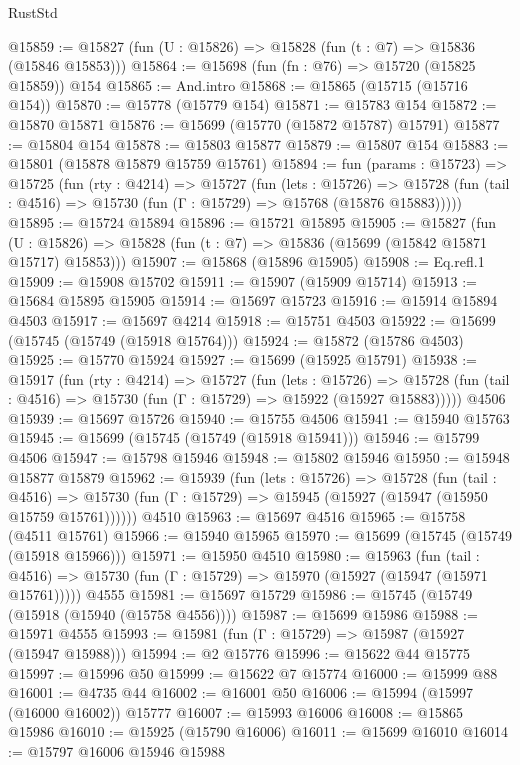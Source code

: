 \begin{lexlean}{RustStd}
\begin{coremodule}
@15859 := @15827 (fun (U : @15826) => @15828 (fun (t : @7) => @15836 (@15846 @15853)))
@15864 := @15698 (fun (fn : @76) => @15720 (@15825 @15859)) @154
@15865 := And.intro
@15868 := @15865 (@15715 (@15716 @154))
@15870 := @15778 (@15779 @154)
@15871 := @15783 @154
@15872 := @15870 @15871
@15876 := @15699 (@15770 (@15872 @15787) @15791)
@15877 := @15804 @154
@15878 := @15803 @15877
@15879 := @15807 @154
@15883 := @15801 (@15878 @15879 @15759 @15761)
@15894 := fun (params : @15723) =>
  @15725
    (fun (rty : @4214) =>
    @15727
      (fun (lets : @15726) =>
      @15728 (fun (tail : @4516) => @15730 (fun (Γ : @15729) => @15768 (@15876 @15883)))))
@15895 := @15724 @15894
@15896 := @15721 @15895
@15905 := @15827
    (fun (U : @15826) => @15828 (fun (t : @7) => @15836 (@15699 (@15842 @15871 @15717) @15853)))
@15907 := @15868 (@15896 @15905)
@15908 := Eq.refl.{1}
@15909 := @15908 @15702
@15911 := @15907 (@15909 @15714)
@15913 := @15684 @15895 @15905
@15914 := @15697 @15723
@15916 := @15914 @15894 @4503
@15917 := @15697 @4214
@15918 := @15751 @4503
@15922 := @15699 (@15745 (@15749 (@15918 @15764)))
@15924 := @15872 (@15786 @4503)
@15925 := @15770 @15924
@15927 := @15699 (@15925 @15791)
@15938 := @15917
    (fun (rty : @4214) =>
    @15727
      (fun (lets : @15726) =>
      @15728 (fun (tail : @4516) => @15730 (fun (Γ : @15729) => @15922 (@15927 @15883)))))
    @4506
@15939 := @15697 @15726
@15940 := @15755 @4506
@15941 := @15940 @15763
@15945 := @15699 (@15745 (@15749 (@15918 @15941)))
@15946 := @15799 @4506
@15947 := @15798 @15946
@15948 := @15802 @15946
@15950 := @15948 @15877 @15879
@15962 := @15939
    (fun (lets : @15726) =>
    @15728
      (fun (tail : @4516) =>
      @15730 (fun (Γ : @15729) => @15945 (@15927 (@15947 (@15950 @15759 @15761))))))
    @4510
@15963 := @15697 @4516
@15965 := @15758 (@4511 @15761)
@15966 := @15940 @15965
@15970 := @15699 (@15745 (@15749 (@15918 @15966)))
@15971 := @15950 @4510
@15980 := @15963
    (fun (tail : @4516) => @15730 (fun (Γ : @15729) => @15970 (@15927 (@15947 (@15971 @15761)))))
    @4555
@15981 := @15697 @15729
@15986 := @15745 (@15749 (@15918 (@15940 (@15758 @4556))))
@15987 := @15699 @15986
@15988 := @15971 @4555
@15993 := @15981 (fun (Γ : @15729) => @15987 (@15927 (@15947 @15988)))
@15994 := @2 @15776
@15996 := @15622 @44 @15775
@15997 := @15996 @50
@15999 := @15622 @7 @15774
@16000 := @15999 @88
@16001 := @4735 @44
@16002 := @16001 @50
@16006 := @15994 (@15997 (@16000 @16002)) @15777
@16007 := @15993 @16006
@16008 := @15865 @15986
@16010 := @15925 (@15790 @16006)
@16011 := @15699 @16010
@16014 := @15797 @16006 @15946 @15988

\end{coremodule}
\end{lexlean}
